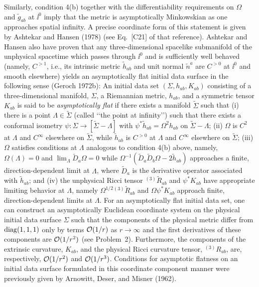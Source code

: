 Similarly, condition 4(b) together with the differentiability requirements on
\(\Omega\) and \(\tilde g_{ab}\) at \(\ii^0\) imply that the metric is asymptotically
Minkowskian as one approaches spatial infinity. A precise coordinate form of this
statement is given by Ashtekar and Hansen (1978) (see Eq.~[C21] of that reference).
Ashtekar and Hansen also have proven that any three-dimensional spacelike
submanifold of the unphysical spacetime which passes through \(\ii^0\) and is
sufficiently well behaved (namely, \(C^{>1}\), i.e., its intrinsic metric
\(\tilde h_{ab}\) and unit normal \(\tilde n^a\) are \(C^{>0}\) at \(\ii^0\) and smooth
elsewhere) yields an asymptotically flat initial data surface in the following sense
(Geroch 1972b): An initial data set \((\Sigma,h_{ab},K_{ab})\) consisting of a
three-dimensional manifold, \(\Sigma\), a Riemannian metric, \(h_{ab}\), and a
symmetric tensor \(K_{ab}\) is said to be \emph{asymptotically flat} if there exists a
manifold \(\tilde\Sigma\) such that (i) there is a point \(\Lambda\in\tilde\Sigma\)
(called \lq\lq the point at infinity\rq\rq) such that there exists a conformal isometry
\(\psi:\Sigma\to[\tilde\Sigma-\Lambda]\) with
\(\psi^*\tilde h_{ab}=\Omega^2h_{ab}\) on \(\tilde\Sigma-\Lambda\); (ii) \(\Omega\)
is \(C^2\) at \(\Lambda\) and \(C^\infty\) elsewhere on \(\tilde\Sigma\), while
\(\tilde h_{ab}\) is \(C^{>0}\) at \(\Lambda\) and \(C^\infty\) elsewhere on
\(\tilde\Sigma\); (iii) \(\Omega\) satisfies conditions at \(\Lambda\) analogous to
condition 4(b) above, namely, \(\Omega(\Lambda)=0\) and
\(\lim_\Lambda\tilde D_a\Omega=0\) while
\(\Omega^{-1}(\tilde D_a\tilde D_b\Omega-2\tilde h_{ab})\) approaches a finite,
direction-dependent limit at \(\Lambda\), where \(\tilde D_a\) is the derivative
operator associated with \(\tilde h_{ab}\); and (iv) the unphysical Ricci tensor
\({}^{(3)}\tilde R_{ab}\) and \(\psi^*K_{ab}\) have appropriate limiting behavior at
\(\Lambda\), namely \(\Omega^{1/2}{}^{(3)}\tilde R_{ab}\) and
\(\Omega\psi^*K_{ab}\) approach finite, direction-dependent limits at \(\Lambda\).
For an asymptotically flat initial data set, one can construct an asymptotically
Euclidean coordinate system on the physical initial data surface \(\Sigma\) such that
the components of the physical metric differ from \(\operatorname{diag}(1,1,1)\) only by terms
\(\mathcal{O}(1/r)\) as \(r\to\infty\) and the first derivatives of these components are
\(\mathcal{O}(1/r^2)\) (see Problem~2). Furthermore, the components of the extrinsic
curvature, \(K_{ab}\), and the physical Ricci curvature tensor, \({}^{(3)}R_{ab}\),
are, respectively, \(\mathcal{O}(1/r^2)\) and \(\mathcal{O}(1/r^3)\). Conditions for
asymptotic flatness on an initial data surface formulated in this coordinate component
manner were previously given by Arnowitt, Deser, and Misner (1962).

